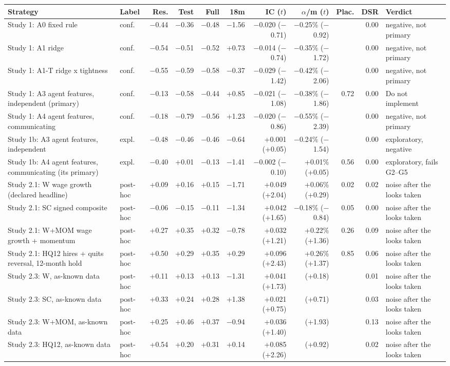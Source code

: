 \setlength{\tabcolsep}{3pt}\begin{tabular}{@{}p{3.6cm} l r r r r r r r r p{2.0cm}@{}}
\toprule
Strategy & Label & Res. & Test & Full & 18m & IC ($t$) & $\alpha$/m ($t$) & Plac. & DSR & Verdict \\
\midrule
Study 1: A0 fixed rule & conf. & $-$0.44 & $-$0.36 & $-$0.48 & $-$1.56 & $-$0.020 ($-$0.71) & $-$0.25\% ($-$0.92) &  & 0.00 & negative, not primary \\
Study 1: A1 ridge & conf. & $-$0.54 & $-$0.51 & $-$0.52 & +0.73 & $-$0.014 ($-$0.74) & $-$0.35\% ($-$1.72) &  & 0.00 & negative, not primary \\
Study 1: A1-T ridge x tightness & conf. & $-$0.55 & $-$0.59 & $-$0.58 & $-$0.37 & $-$0.029 ($-$1.42) & $-$0.42\% ($-$2.06) &  & 0.00 & negative, not primary \\
Study 1: A3 agent features, independent (primary) & conf. & $-$0.13 & $-$0.58 & $-$0.44 & +0.85 & $-$0.021 ($-$1.08) & $-$0.38\% ($-$1.86) & 0.72 & 0.00 & Do not implement \\
Study 1: A4 agent features, communicating & conf. & $-$0.18 & $-$0.79 & $-$0.56 & +1.23 & $-$0.020 ($-$0.86) & $-$0.55\% ($-$2.39) &  & 0.00 & negative, not primary \\
Study 1b: A3 agent features, independent & expl. & $-$0.48 & $-$0.46 & $-$0.46 & $-$0.64 & +0.001 (+0.05) & $-$0.24\% ($-$1.54) &  & 0.00 & exploratory, negative \\
Study 1b: A4 agent features, communicating (its primary) & expl. & $-$0.40 & +0.01 & $-$0.13 & $-$1.41 & $-$0.002 ($-$0.10) & +0.01\% (+0.05) & 0.56 & 0.00 & exploratory, fails G2--G5 \\
Study 2.1: W wage growth (declared headline) & post-hoc & +0.09 & +0.16 & +0.15 & $-$1.71 & +0.049 (+2.04) & +0.06\% (+0.29) & 0.02 & 0.02 & noise after the looks taken \\
Study 2.1: SC signed composite & post-hoc & $-$0.06 & $-$0.15 & $-$0.11 & $-$1.34 & +0.042 (+1.65) & $-$0.18\% ($-$0.84) & 0.05 & 0.00 & noise after the looks taken \\
Study 2.1: W+MOM wage growth + momentum & post-hoc & +0.27 & +0.35 & +0.32 & $-$0.78 & +0.032 (+1.21) & +0.22\% (+1.36) & 0.26 & 0.09 & noise after the looks taken \\
Study 2.1: HQ12 hires + quits reversal, 12-month hold & post-hoc & +0.50 & +0.29 & +0.35 & +0.29 & +0.096 (+2.43) & +0.26\% (+1.37) & 0.85 & 0.06 & noise after the looks taken \\
Study 2.3: W, as-known data & post-hoc & +0.11 & +0.13 & +0.13 & $-$1.31 & +0.041 (+1.73) & (+0.18) &  & 0.01 & noise after the looks taken \\
Study 2.3: SC, as-known data & post-hoc & +0.33 & +0.24 & +0.28 & +1.38 & +0.021 (+0.75) & (+0.71) &  & 0.03 & noise after the looks taken \\
Study 2.3: W+MOM, as-known data & post-hoc & +0.25 & +0.46 & +0.37 & $-$0.94 & +0.036 (+1.40) & (+1.93) &  & 0.13 & noise after the looks taken \\
Study 2.3: HQ12, as-known data & post-hoc & +0.54 & +0.20 & +0.31 & +0.14 & +0.085 (+2.26) & (+0.92) &  & 0.02 & noise after the looks taken \\
\bottomrule
\end{tabular}
